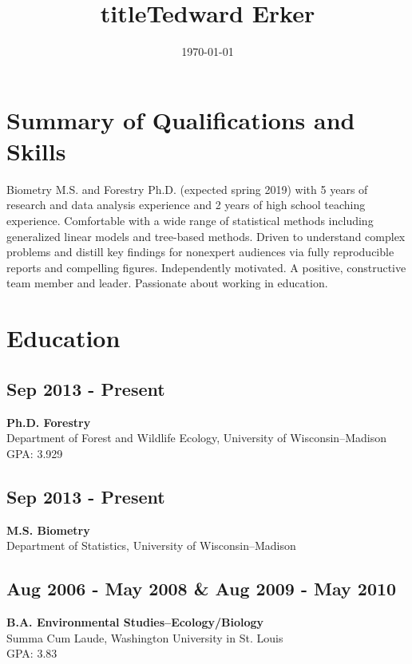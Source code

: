 \documentclass[11pt]{moderncv}
\title{title}                               %
\date{\today}
\title{Tedward Erker}
\begin{document}
\maketitle
\section*{Summary of Qualifications and Skills}
\label{sec:org5ba84c1}
Biometry M.S. and Forestry Ph.D. (expected spring 2019) with 5 years
of research and data analysis experience and 2 years of high school
teaching experience.  Comfortable with a wide range of statistical
methods including generalized linear models and tree-based
methods. Driven to understand complex problems and distill key
findings for nonexpert audiences via fully reproducible reports and
compelling figures.  Independently motivated. A positive, constructive
team member and leader.  Passionate about working in education.
\section*{Education}
\label{sec:org2ed049a}
\subsection*{Sep 2013 - Present}
\label{sec:orgbf16505}
\textbf{Ph.D. Forestry} \\
Department of Forest and Wildlife Ecology, University of Wisconsin--Madison \\
GPA: 3.929

\subsection*{Sep 2013 - Present}
\label{sec:org9232b38}
\textbf{M.S. Biometry} \\
Department of Statistics, University of Wisconsin--Madison

\subsection*{Aug 2006 - May 2008 \& Aug 2009 - May 2010}
\label{sec:orgffcf826}
\textbf{B.A. Environmental Studies--Ecology/Biology} \\
Summa Cum Laude, Washington University in St. Louis \\
GPA: 3.83
\end{document}
